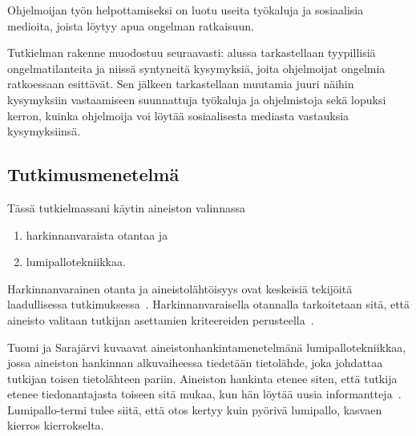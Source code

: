 \documentclass[finnish]{tktltiki2}
\theoremstyle{definition}
\theoremstyle{remark}
\begin{document}

Ohjelmoijan työn helpottamiseksi on luotu useita työkaluja ja sosiaalisia medioita, joista löytyy apua ongelman ratkaisuun.

Tutkielman rakenne muodostuu seuraavasti: alussa tarkastellaan tyypillisiä ongelmatilanteita ja niissä syntyneitä kysymyksiä, joita ohjelmoijat ongelmia ratkoessaan esittävät. Sen jälkeen tarkastellaan muutamia juuri näihin kysymyksiin vastaamiseen suunnattuja työkaluja ja ohjelmistoja sekä lopuksi kerron, kuinka ohjelmoija voi löytää sosiaalisesta mediasta vastauksia kysymyksiinsä.

\subsection{Tutkimusmenetelmä}

Tässä tutkielmassani käytin aineiston valinnassa
\begin{enumerate}
  \item harkinnanvaraista otantaa ja
  \item lumipallotekniikkaa.
\end{enumerate}

Harkinnanvarainen otanta ja aineistolähtöisyys ovat keskeisiä tekijöitä laadullisessa tutkimuksessa~\cite[s. 16-20]{laadullinen-tutkimus-ja-sisallonanalyysi}.
Harkinnanvaraisella otannalla tarkoitetaan sitä, että aineisto valitaan tutkijan asettamien kriteereiden perusteella~\cite{aineiston-maara-ja-tutkittavat}.

Tuomi ja Sarajärvi kuvaavat aineistonhankintamenetelmänä lumipallotekniikkaa, jossa aineiston hankinnan alkuvaiheessa tiedetään tietolähde, joka johdattaa tutkijan toisen tietolähteen pariin. Aineiston hankinta etenee siten, että tutkija etenee tiedonantajasta toiseen sitä mukaa, kun hän löytää uusia informantteja~\cite[s. 88]{johdatus-laadulliseen-tutkimukseen}. Lumipallo-termi tulee siitä, että otos kertyy kuin pyörivä lumipallo, kasvaen kierros kierrokselta.
\end{document}
